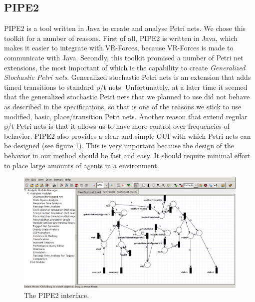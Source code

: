 \documentclass[11pt, a4paper]{book}
\begin{document}
\subsection{PIPE2}
PIPE2 is a tool written in Java to create and analyse Petri nets. We chose this toolkit for a number of reasons. First of all, PIPE2 is written in Java, which makes it easier to integrate with VR-Forces, because VR-Forces is made to communicate with Java. Secondly, this toolkit promised a number of Petri net extensions, the most important of which is the capability to create \emph{Generalized Stochastic Petri nets}. Generalized stochastic Petri nets is an extension that adds timed transitions to standard p/t nets. Unfortunately, at a later time it seemed that the generalized stochastic Petri nets that we planned to use did not behave as described in the specifications, so that is one of the reasons we stick to use modified, basic, place/transition Petri nets. Another reason that extend regular p/t Petri nets is that it allows us to have more control over frequencies of behavior. PIPE2 also provides a clear and simple GUI with which Petri nets can be designed (see figure \ref{fig:pipegui}). This is very important because the design of the behavior in our method should be fast and easy. It should require minimal effort to place large amounts of agents in a environment. 

\begin{figure}
\centering
\includegraphics[width=.8\textwidth]{pipe_screenshot}
\caption{The PIPE2 interface.}
\label{fig:pipegui}
\end{figure}
\end{document}
